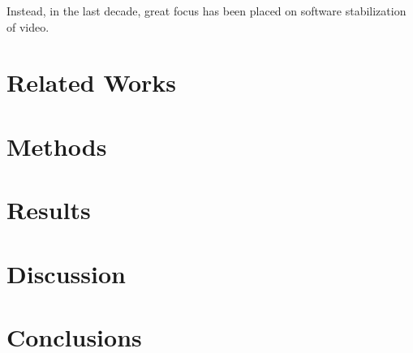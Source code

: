 \documentclass{article} %
\begin{document}
Instead, in the last decade, great focus has been placed on software stabilization of video.

\section{Related Works}

\section{Methods}

\section{Results}

\section{Discussion}

\section{Conclusions}



\end{document}
